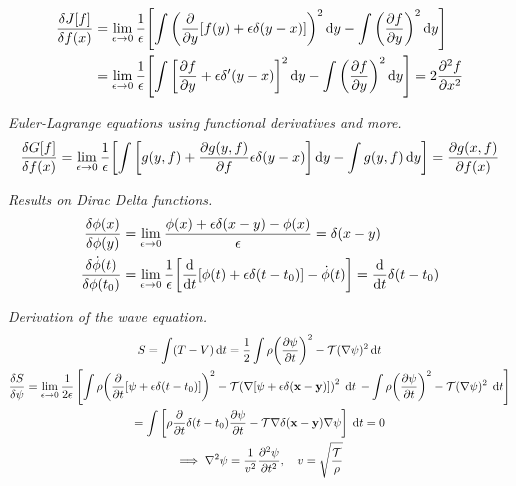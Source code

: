 \documentclass{report}
\begin{document}
\begin{subquests}
\begin{subquests}
	 	\item
	 	\begin{align*}
	 		\fdv{J[f]}{f(x)} & = \lim_{\epsilon \to 0} \frac{1}{\epsilon}\bqty{\int \pqty{\pdv{y}[f(y) + \epsilon\delta(y-x)]}^2 \dd{y} - \int \pqty{\pdv{f}{y}}^2 \dd{y}} \\
			& = \lim_{\epsilon \to 0} \frac{1}{\epsilon}\bqty{\int \bqty{\pdv{f}{y} + \epsilon\delta'(y-x)}^2 \dd{y} - \int \pqty{\pdv{f}{y}}^2 \dd{y}} =	2\pdv[2]{f}{x}
	 	\end{align*}
	\end{subquests}
	

	\item \emph{Euler-Lagrange equations using functional derivatives and more.}
	\begin{gather*}
		\fdv{G[f]}{f(x)} = \lim_{\epsilon \to 0} \frac{1}{\epsilon}\bqty{\int \bqty{g(y,f) + \pdv{g(y,f)}{f}\epsilon\delta(y-x)}\dd{y} - \int g(y,f)\dd{y}} = \pdv{g(x,f)}{f(x)}
 	\end{gather*}

 	\item \emph{Results on Dirac Delta functions.}
 	\begin{align*}
		\fdv{\phi(x)}{\phi(y)} & = \lim_{\epsilon \to 0} \frac{\phi(x) + \epsilon\delta(x-y) - \phi(x)}{\epsilon} = \delta(x-y) \\
		\fdv{\dot{\phi}(t)}{\phi(t_0)} & = \lim_{\epsilon\to 0} \frac{1}{\epsilon}\bqty{\dv{t}[\phi(t) + \epsilon\delta(t - t_0)] - \dot{\phi}(t)} = \dv{t}\delta(t-t_0) 
	\end{align*}

	\item \emph{Derivation of the wave equation.} 
	\begin{gather*}
		S = \int (T - V) \dd{t} = \frac{1}{2}\int \rho\pqty{\pdv{\psi}{t}}^2 - \mathcal T(\nabla\psi)^2 \dd{t} \\
		\fdv{S}{\psi} = \lim_{\epsilon \to 0}\frac{1}{2\epsilon}\left[\int\rho\pqty{\pdv{t}[\psi + \epsilon\delta(t-t_0)]}^2 - \mathcal T\pqty{\nabla[\psi + \epsilon\delta({\vb x} - {\vb y})]}^2 \;\dd{t} \right.	\left. - \int \rho\pqty{\pdv{\psi}{t}}^2 - \mathcal T(\nabla\psi)^2\;\dd{t} \right] \\
		= \int\bqty{\rho\pdv{t}\delta(t-t_0)\pdv{\psi}{t} - \mathcal T\nabla\delta({\vb x}-{\vb y})\nabla\psi}\;\dd{t} = 0 \\
		\implies \nabla^2 \psi = \frac{1}{v^2}\pdv[2]{\psi}{t},\quad v = \sqrt{\frac{\cal{T}}{\rho}}
	\end{gather*}


\end{subquests}
\end{document}
